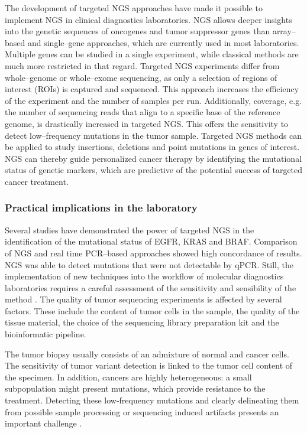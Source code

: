 {{    The development of targeted NGS approaches have made it possible to
    implement NGS in clinical diagnostics laboratories. NGS allows deeper
    insights into the genetic sequences of oncogenes and tumor suppressor
    genes than array--based and single--gene approaches, which are currently
    used in most laboratories. Multiple genes can be studied in a single
    experiment, while classical methods are much more restricted in that
    regard. Targeted NGS experiments differ from whole--genome or whole--exome
    sequencing, as only a selection of regions of interest (ROIs) is captured
    and sequenced. This approach increases the efficiency of the experiment
    and the number of samples per run. Additionally, coverage, e.g. the number
    of sequencing reads that align to a specific base of the reference genome,
    is drastically increased in targeted NGS. This offers the sensitivity to
    detect low--frequency mutations in the tumor sample. Targeted NGS methods
    can be applied to study insertions, deletions and point mutations in genes
    of interest. NGS can thereby guide personalized cancer therapy by
    identifying the mutational status of genetic markers, which are predictive
    of the potential success of targeted cancer treatment.

    \subsubsection{Practical implications in the laboratory}

      Several studies have demonstrated the power of targeted NGS in the
      identification of the mutational status of EGFR, KRAS and BRAF. Comparison
      of NGS and real time PCR--based approaches showed high concordance of
      results. NGS was able to detect mutations that were not detectable by
      qPCR. Still, the implementation of new techniques into the workflow of molecular
      diagnostics laboratories requires a careful assessment of the sensitivity
      and sensibility of the method {\cite{implementation}}. The quality of tumor sequencing
      experiments is affected by several factors. These include the content of
      tumor cells in the sample, the quality of the tissue material, the choice
      of the sequencing library preparation kit and the bioinformatic pipeline.

      The tumor biopsy usually consists of an admixture of normal and cancer
      cells. The sensitivity of tumor variant detection is linked to the tumor
      cell content of the specimen. In addition, cancers are highly
      heterogeneous: a small subpopulation might present mutations, which
      provide resistance to the treatment. Detecting these low-frequency
      mutations and clearly delineating them from possible sample processing or
      sequencing induced artifacts presents an important challenge {\cite{ffpe_ngs}}.

}}
